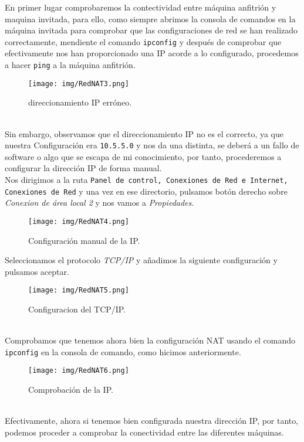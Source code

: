 \documentclass[12pt]{article}
\begin{document}
      \newpage

      En primer lugar comprobaremos la contectividad entre máquina anfitrión y maquina invitada, para ello, como siempre abrimos la consola de comandos en la máquina 
      invitada para comprobar que las configuraciones de red se han realizado correctamente, mendiente el comando \texttt{ipconfig} y después de comprobar que efectivamente
      nos han proporcionado una IP acorde a lo configurado, procedemos a hacer \texttt{ping} a la máquina anfitrión.
      \begin{figure}[h]
        \centering
        \texttt{[image: img/RedNAT3.png]}
        \caption{direccionamiento IP erróneo.}
        \label{RedNAT3}
      \end{figure}
      \\
      Sin embargo, observamos que el direccionamiento IP no es el correcto, ya que nuestra Configuración era \texttt{10.5.5.0} y nos da una distinta, se deberá a un fallo de 
      software o algo que se escapa de mi conocimiento, por tanto, procederemos a configurar la dirección IP de forma manual.
      \\
      Nos dirigimos a la ruta \texttt{Panel de control, Conexiones de Red e Internet, Conexiones de Red} y una vez en ese directorio, pulsamos botón derecho sobre \textit{Conexion
      de área local 2} y nos vamos a \textit{Propiedades}.
      \begin{figure}[h]
        \centering
        \texttt{[image: img/RedNAT4.png]}
        \caption{Configuración manual de la IP.}
        \label{RedNAT4}
      \end{figure}
      
      \newpage

      Seleccionamos el protocolo \textit{TCP/IP} y añadimos la siguiente configuración y pulsamos aceptar.
      \begin{figure}[h]
        \centering
        \texttt{[image: img/RedNAT5.png]}
        \caption{Configuracion del TCP/IP.}
        \label{RedNAT5}
      \end{figure}
      \\
      Comprobamos que tenemos ahora bien la configuración NAT usando el comando \texttt{ipconfig} en la 
      consola de comando, como hicimos anteriormente.
      \begin{figure}[h]
        \centering
        \texttt{[image: img/RedNAT6.png]}
        \caption{Comprobación de la IP.}
        \label{RedNAT6}
      \end{figure}
      \\
      Efectivamente, ahora si tenemos bien configurada nuestra dirección IP, por tanto, podemos proceder a comprobar 
      la conectividad entre las diferentes máquinas.
\end{document}
